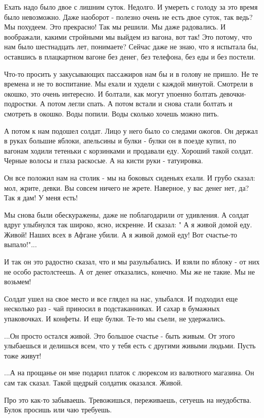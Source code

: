Ехать надо было двое с лишним суток. Недолго. И умереть с голоду за это время было невозможно. Даже наоборот - полезно очень не есть двое суток, так ведь? Мы похудеем. Это прекрасно! Так мы решили. Мы даже радовались. И воображали, какими стройными мы выйдем из вагона, вот так! Это потому, что нам было шестнадцать лет, понимаете? Сейчас даже не знаю, что я испытала бы, оставшись в плацкартном вагоне без денег, без телефона, без еды и без постели. 
 
Что-то просить у закусывающих пассажиров нам бы и в голову не пришло. Не те времена и не то воспитание. Мы ехали и худели с каждой минутой. Смотрели в окошко, это очень интересно. И болтали, как могут упоенно болтать девочки-подростки. А потом легли спать. А потом встали и снова стали болтать и смотреть в окошко. Воды попили. Воды сколько хочешь можно пить. 
 
А потом к нам подошел солдат. Лицо у него было со следами ожогов. Он держал в руках большие яблоки, апельсины и булки - булки он в поезде купил, по вагонам ходили тетеньки с корзинками и продавали еду. Хороший такой солдат. Черные волосы и глаза раскосые. А на кисти руки - татуировка. 
 
Он все положил нам на столик - мы на боковых сиденьях ехали. И грубо сказал: мол, жрите, девки. Вы совсем ничего не жрете. Наверное, у вас денег нет, да? Так я дам! У меня есть! 
 
Мы снова были обескуражены, даже не поблагодарили от удивления. А солдат вдруг улыбнулся так широко, ясно, искренне. И сказал: " А я живой домой еду. Живой! Наших всех в Афгане убили. А я живой домой еду! Вот счастье-то выпало!"... 
 
И так он это радостно сказал, что и мы разулыбались. И взяли по яблоку - от них не особо растолстеешь. А от денег отказались, конечно. Мы же не такие. Мы не возьмем! 
 
Солдат ушел на свое место и все глядел на нас, улыбался. И подходил еще несколько раз - чай приносил в подстаканниках. И сахар в бумажных упаковочках. И конфеты. И еще булки. Те-то мы съели, не удержались. 
 
...Он просто остался живой. Это большое счастье - быть живым. От этого улыбаешься и делишься всем, что у тебя есть с другими живыми людьми. Пусть тоже живут! 
 
...А на прощанье он мне подарил платок с люрексом из валютного магазина. Он сам так сказал. Такой щедрый солдатик оказался. Живой. 
 
Про это как-то забываешь. Тревожишься, переживаешь, сетуешь на неудобства. Булок просишь или чаю требуешь. 
 
